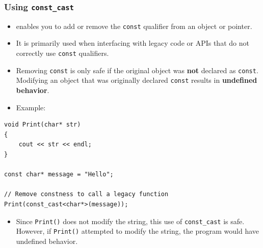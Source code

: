 \documentclass[10pt]{article}
\newcommand{\vocab}[1]{\fbox{\textbf{\textit{#1}}}}
\begin{document}
\subsubsection{Using \texttt{const\_cast}}
\begin{itemize}
    \item \vocab{const\_cast} enables you to add or remove the \verb|const| qualifier from an object or pointer.

    \item It is primarily used when interfacing with legacy code or APIs that do not correctly use \verb|const| qualifiers.

    \item Removing \verb|const| is only safe if the original object was \textbf{not} declared as \verb|const|. Modifying an object that was originally declared \verb|const| results in \textbf{undefined behavior}.

    \item Example:
\end{itemize}

\begin{verbatim}
void Print(char* str)
{
    cout << str << endl;
}

const char* message = "Hello";

// Remove constness to call a legacy function
Print(const_cast<char*>(message));
\end{verbatim}

\begin{itemize}
    \item Since \verb|Print()| does not modify the string, this use of \verb|const_cast| is safe. However, if \verb|Print()| attempted to modify the string, the program would have undefined behavior.
\end{itemize}

\newpage
\end{document}
